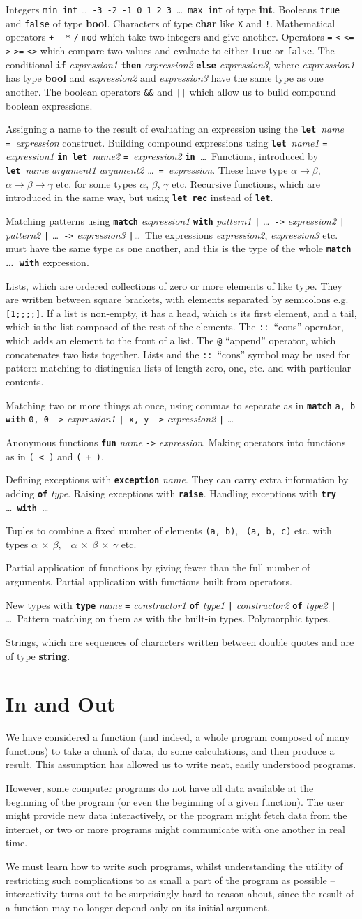 \documentclass[]{book}
\makeatletter
\newcommand\upquote[1]{\textquotesingle#1\textquotesingle}
\newcommand{\sofarstartingoff}{

\noindent 1

\noindent Integers \texttt{min\_int} \ldots\ \texttt{-3}\ \texttt{-2}\ \texttt{-1}\ \texttt{0}\ \texttt{1}\ \texttt{2}\ \texttt{3}\ \ldots\ \texttt{max\_int} of type \textbf{\textrm{int}}. Booleans \texttt{true} and \texttt{false} of type \textbf{\textrm{bool}}. \noindent Characters of type \textrm{\textbf{char}} like \texttt{\upquote{X}} and \texttt{\upquote{!}}. Mathematical operators \texttt{+} \texttt{-} \texttt{*} \texttt{/} \texttt{mod} which take two integers and give another. Operators \texttt{=} \texttt{<} \texttt{<=} \texttt{>} \texttt{>=} \texttt{<>} which compare two values and evaluate to either \texttt{true} or \texttt{false}. The conditional \textbf{\texttt{if}} \textit{expression1} \textbf{\texttt{then}} \textit{expression2} \textbf{\texttt{else}} \textit{expression3}, where \textit{expresssion1} has type \textrm{\textbf{bool}} and \textit{expression2} and \textit{expression3} have the same type as one another. The boolean operators \texttt{\&\&} and \texttt{||} which allow us to build compound boolean expressions.}
\newcommand{\sofarfunctions}
{
\noindent 2

\noindent Assigning a name to the result of evaluating an expression using the \textbf{\texttt{let}}\ \textit{name} \texttt{=}\ \textit{expression} construct. Building compound expressions using \textbf{\texttt{let}}\ \textit{name1} \texttt{=} \textit{expression1} \textbf{\texttt{in}}\ \textbf{\texttt{let}}\ \textit{name2} \texttt{=}\ \textit{expression2} \textbf{\texttt{in}}\ \ldots \ Functions, introduced by \textbf{\texttt{let}}\ \textit{name} \textit{argument1} \textit{argument2} \ldots\ \texttt{=}\ \textit{expression}. These have type $\alpha \rightarrow \beta$, $\alpha \rightarrow \beta \rightarrow \gamma$ etc. for some types $\alpha$, $\beta$, $\gamma$ etc. Recursive functions, which are introduced in the same way, but using \textbf{\texttt{let rec}} instead of \textbf{\texttt{let}}.}
\newcommand{\sofarcasebycase}
{\noindent 3

\noindent Matching patterns using \textbf{\texttt{match}} \textit{expression1} \textbf{\texttt{with}} \textit{pattern1} \texttt{|} \ldots\ \texttt{->} \textit{expression2} \texttt{|} \textit{pattern2} \texttt{|} \ldots\ \texttt{->} \textit{expression3} \texttt{|}\ldots \ The expressions \textit{expression2}, \textit{expression3} etc. must have the same type as one another, and this is the type of the whole \textbf{\texttt{match} \ldots\ \texttt{with}} expression.}
\newcommand{\sofarlistingthings}
{
\noindent 4

\noindent Lists, which are ordered collections of zero or more elements of like type. They are written between square brackets, with elements separated by semicolons e.g. \texttt{[1;\! 2;\! 3;\! 4;\! 5]}. If a list is non-empty, it has a head, which is its first element, and a tail, which is the list composed of the rest of the elements. The \texttt{::}\ ``cons'' operator, which adds an element to the front of a list. The \texttt{@} ``append'' operator, which concatenates two lists together. Lists and the \texttt{::}\ ``cons'' symbol may be used for pattern matching to distinguish lists of length zero, one, etc. and with particular contents.}
\newcommand{\sofarsortingthings}
{
\noindent 5

\noindent Matching two or more things at once, using commas to separate as in \texttt{\textbf{match}} \texttt{a, b} \textbf{\texttt{with}} \texttt{0, 0 ->} \textit{expression1} \texttt{|\ x, y ->} \textit{expression2} \texttt{|} \ldots
}
\newcommand{\sofarfunctionsuponfunctions}
{
\noindent 6

\noindent Anonymous functions \textbf{\texttt{fun}} \textit{name} \texttt{->} \textit{expression}. Making operators into functions as in \texttt{(\! <\! )} and \texttt{(\! +\! )}.
}
\newcommand{\sofarwhenthingsgowrong}
{
\noindent 7

\noindent Defining exceptions with \textbf{\texttt{exception}} \textit{name}. They can carry extra information by adding \textbf{\texttt{of}} \textit{type}. Raising exceptions with \textbf{\texttt{raise}}. Handling exceptions with \textbf{\texttt{try}} \ldots\ \textbf{\texttt{with}}\ \ldots}
\newcommand{\sofarlookingthingsup}
{
\noindent 8

\noindent Tuples to combine a fixed number of elements \texttt{(a,\! b)},\!    \ \texttt{(a,\! b,\! c)} etc. with types \textrm{\textbf{$\alpha$ $\times$ $\beta$}},\ \  \textrm{\textbf{$\alpha$ $\times$ $\beta$ $\times$ $\gamma$}} etc.
}
\newcommand{\sofarmorewithfunctions}
{
\noindent 9

\noindent Partial application of functions by giving fewer than the full number of arguments. Partial application with functions built from operators.
}
\newcommand{\sofarnewkindsofdata}
{
\noindent 10

\noindent New types with \textbf{\texttt{type}} \textit{name} \texttt{=} \textit{constructor1} \textbf{\texttt{of}} \textit{type1} \texttt{|} \textit{constructor2} \textbf{\texttt{of}} \textit{type2} \texttt{|} \ldots\ Pattern matching on them as with the built-in types. Polymorphic types.
}
\newcommand{\sofargrowingtrees}
{
\noindent 11

\noindent Strings, which are sequences of characters written between double quotes and are of type \textbf{\textrm{string}}.
}
\makeatother
\begin{document}
{\footnotesize
\sofarstartingoff

\vspace{\baselineskip}
\sofarfunctions

\vspace{\baselineskip}
\sofarcasebycase

\vspace{\baselineskip}
\sofarlistingthings

\vspace{\baselineskip}
\sofarsortingthings

\vspace{\baselineskip}
\sofarfunctionsuponfunctions

\vspace{\baselineskip}
\sofarwhenthingsgowrong

\vspace{\baselineskip}
\sofarlookingthingsup

\vspace{\baselineskip}
\sofarmorewithfunctions

\vspace{\baselineskip}
\sofarnewkindsofdata

\vspace{\baselineskip}
\sofargrowingtrees
}

\pagestyle{empty}


\chapter{In and Out}
\pagestyle{fancy}
\label{inandout}

We have considered a function (and indeed, a whole program composed of many functions) to take a chunk of data, do some calculations, and then produce a result. This assumption has allowed us to write neat, easily understood programs.

However, some computer programs do not have all data available at the beginning of the program (or even the beginning of a given function). The user might provide new data interactively, or the program might fetch data from the internet, or two or more programs might communicate with one another in real time.

We must learn how to write such programs, whilst understanding the utility of restricting such complications to as small a part of the program as possible -- interactivity turns out to be surprisingly hard to reason about, since the result of a function may no longer depend only on its initial argument.
\end{document}
